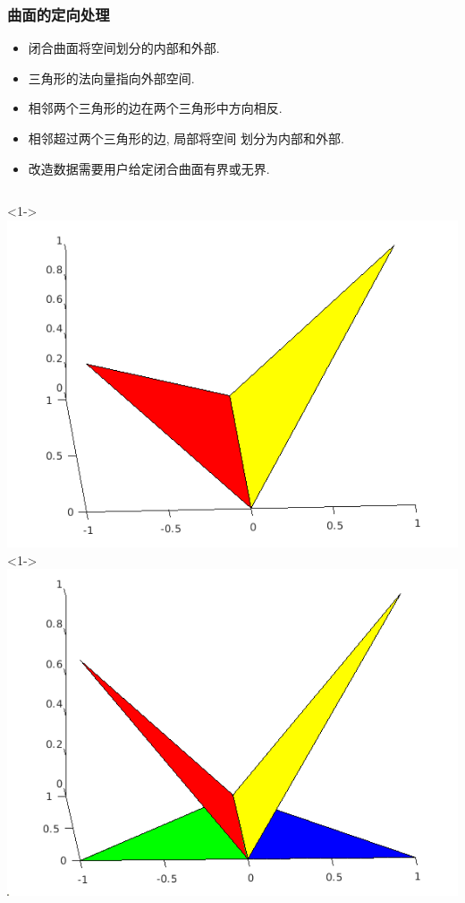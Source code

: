 \documentclass[UTF8]{ctexbeamer}	%
\theoremstyle{plain}
\theoremstyle{definition}
\theoremstyle{remark}
\numberwithin{equation}{section}
\begin{document}
\begin{frame}
    \frametitle{曲面的定向处理}
    \begin{itemize}
        \item 闭合曲面将空间划分的内部和外部.

        \item 三角形的法向量指向外部空间.
        
        \item 相邻两个三角形的边在两个三角形中方向相反.
        
        \item 相邻超过两个三角形的边, 局部将空间
        划分为内部和外部.

        \item 改造数据需要用户给定闭合曲面有界或无界.
        
    \end{itemize}
    \begin{columns}
        <1->
        \centering
        \includegraphics[width = .8\textwidth]{fig/nearTri1.png}
        <1->
        \centering
        \includegraphics[width = .8\textwidth]{fig/nearTri2.png}
    \end{columns}
\end{frame}
\end{document}
